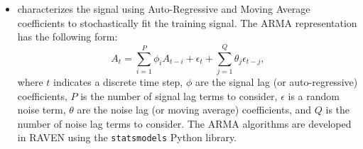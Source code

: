 {\begin{itemize}
     has the following parameters:
    \begin{itemize}
      \item {}, , indicates which
        target signals should be trained as part of this entity using this TSA algorithm.
      \item {}, , provides a static seed to be used for
        random number generation in this algorithm. Unused for the Fourier TSA algorithm.
    \end{itemize}
     further has the following subnodes:
    \begin{itemize}
      \item {}, , indicates which base
        periods whose Fourier representations should be fit to the training signal. For example, in
        a signal with hourly measurements, selecting the period  would fit the daily
        (24-hour) and half-daily (12-hour) periodic trends.
    \end{itemize}

  \item {} characterizes the signal using Auto-Regressive and Moving Average
    coefficients to stochastically fit the training signal.
    The ARMA representation has the following form:
    \begin{equation*}
      A_t = \sum_{i=1}^P \phi_i A_{t-i} + \epsilon_t + \sum_{j=1}^Q \theta_j \epsilon_{t-j},
    \end{equation*}
    where $t$ indicates a discrete time step, $\phi$ are the signal lag (or auto-regressive)
    coefficients, $P$ is the number of signal lag terms to consider, $\epsilon$ is a random noise
    term, $\theta$ are the noise lag (or moving average) coefficients, and $Q$ is the number of
    noise lag terms to consider. The ARMA algorithms are developed in RAVEN using the
    \texttt{statsmodels} Python library.


\end{itemize}}

